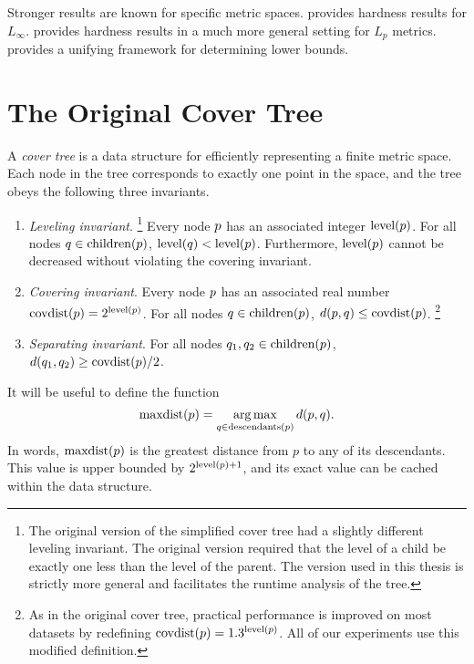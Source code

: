 \documentclass[../main.tex]{subfiles}
\newcommand{\dist}[2]{\distf({#1},{#2})}
\newcommand{\distf}{d}
\newcommand{\p}{\ensuremath p}
\newcommand{\q}{\ensuremath q}
\newcommand{\mkfunction}[1]{\ifmmode{\textnormal{{#1}}}}
\newcommand{\level}[1]      {\mkfunction{level}({#1})}
\newcommand{\children}[1]   {\mkfunction{children}({#1})}
\newcommand{\covdist}[1]    {\mkfunction{covdist}({#1})}
\newcommand{\descendants}[1]{\mkfunction{descendants}({#1})}
\newcommand{\maxdist}[1]    {\mkfunction{maxdist}({#1})}
\begin{document}
{Stronger results are known for specific metric spaces.
\cite{andoni2008hardness} provides hardness results for $L_\infty$.
\cite{andoni2016lower} provides hardness results in a much more general setting for $L_p$ metrics.
\cite{p2011unifying} provides a unifying framework for determining lower bounds.
}



\section{The Original Cover Tree}

A \emph{cover tree} is a data structure for efficiently representing a finite metric space.
Each node in the tree corresponds to exactly one point in the space,
and the tree obeys the following three invariants.
\begin{enumerate}
    \item \emph{Leveling invariant}.%
    \footnote{
        The original version of the simplified cover tree \citep{izbicki2015faster} had a slightly different leveling invariant.
        The original version required that the level of a child be exactly one less than the level of the parent.
        The version used in this thesis is strictly more general and facilitates the runtime analysis of the tree.
    }
    Every node $\p$ has an associated integer $\level\p$.
    For all nodes $\q\in\children\p$, $\level\q < \level\p$.
    Furthermore, $\level p$ cannot be decreased without violating the covering invariant.
    \item \emph{Covering invariant}.
    Every node $\p$ has an associated real number $\covdist\p=2^{\level\p}$.
    For all nodes $\q\in\children\p$, $\dist \p \q \le \covdist\p$.%
    \footnote{
        As in the original cover tree, practical performance is improved on most datasets by redefining $\covdist p = 1.3 ^ {\level p}$.
        All of our experiments use this modified definition.
    }
    \item \emph{Separating invariant}.
    For all nodes $\q_1,\q_2\in\children\p$, $\dist {\q_1} {\q_2} \ge \covdist\p/2$.
\end{enumerate}
It will be useful to define the function
\begin{equation}
\maxdist p = \argmax_{q\in\descendants{p}} \dist p q
.
\end{equation}
In words, $\maxdist\p$ is the greatest distance from $p$ to any of its descendants.
This value is upper bounded by $2^{\level{p}+1}$, 
and its exact value can be cached within the data structure.
\end{document}

